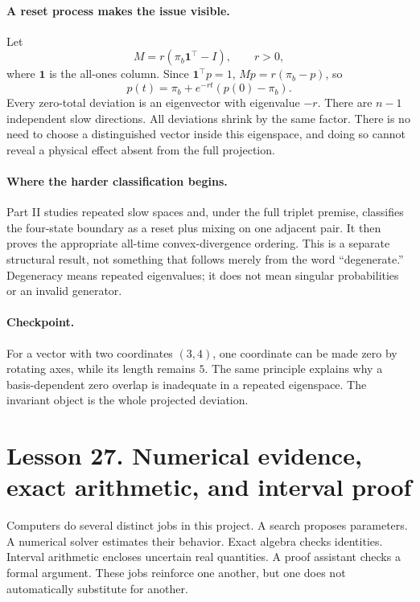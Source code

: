 \documentclass[11pt]{article}
\begin{document}
\paragraph{A reset process makes the issue visible.}
Let
\[
M=r(\pi_b\mathbf1^\top-I),\qquad r>0,
\]
where $\mathbf1$ is the all-ones column. Since $\mathbf1^\top p=1$,
$Mp=r(\pi_b-p)$, so
\[
p(t)=\pi_b+e^{-rt}(p(0)-\pi_b).
\]
Every zero-total deviation is an eigenvector with eigenvalue $-r$.
There are $n-1$ independent slow directions. All deviations shrink by the
same factor. There is no need to choose a distinguished vector inside
this eigenspace, and doing so cannot reveal a physical effect absent from
the full projection.

\paragraph{Where the harder classification begins.}
Part II studies repeated slow spaces and, under the full triplet premise,
classifies the four-state boundary as a reset plus mixing on one adjacent
pair. It then proves the appropriate all-time convex-divergence ordering.
This is a separate structural result, not something that follows merely
from the word ``degenerate.'' Degeneracy means repeated eigenvalues;
it does not mean singular probabilities or an invalid generator.

\paragraph{Checkpoint.}
For a vector with two coordinates $(3,4)$, one coordinate can be made zero
by rotating axes, while its length remains $5$. The same principle explains
why a basis-dependent zero overlap is inadequate in a repeated eigenspace.
The invariant object is the whole projected deviation.

\clearpage
\section*{Lesson 27. Numerical evidence, exact arithmetic, and interval proof}
Computers do several distinct jobs in this project. A search proposes
parameters. A numerical solver estimates their behavior. Exact algebra
checks identities. Interval arithmetic encloses uncertain real quantities.
A proof assistant checks a formal argument. These jobs reinforce one
another, but one does not automatically substitute for another.
\end{document}
